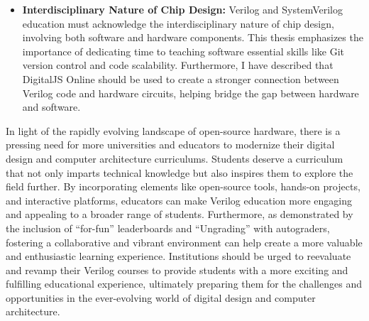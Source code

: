 \begin{itemize}
    \item \textbf{Interdisciplinary Nature of Chip Design:} Verilog and SystemVerilog education must acknowledge the interdisciplinary nature of chip design, involving both software and hardware components. This thesis emphasizes the importance of dedicating time to teaching software essential skills like Git version control and code scalability. Furthermore, I have described that DigitalJS Online should be used to create a stronger connection between Verilog code and hardware circuits, helping bridge the gap between hardware and software.
\end{itemize}

In light of the rapidly evolving landscape of open-source hardware, there is a pressing need for more universities and educators to modernize their digital design and computer architecture curriculums. Students deserve a curriculum that not only imparts technical knowledge but also inspires them to explore the field further. By incorporating elements like open-source tools, hands-on projects, and interactive platforms, educators can make Verilog education more engaging and appealing to a broader range of students. Furthermore, as demonstrated by the inclusion of \enquote{for-fun} leaderboards and \enquote{Ungrading} with autograders, fostering a collaborative and vibrant environment can help create a more valuable and enthusiastic learning experience. Institutions should be urged to reevaluate and revamp their Verilog courses to provide students with a more exciting and fulfilling educational experience, ultimately preparing them for the challenges and opportunities in the ever-evolving world of digital design and computer architecture.
